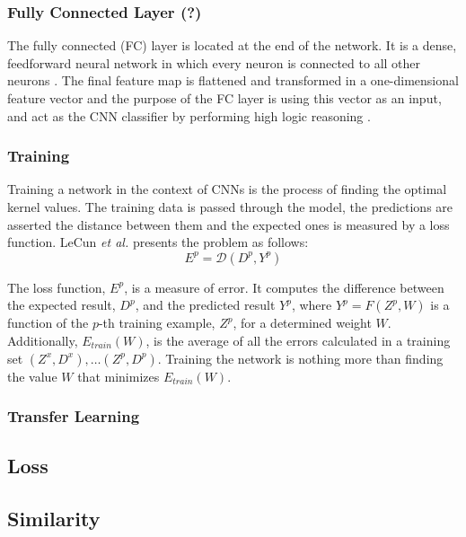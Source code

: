 \documentclass[class=report, crop=false, a4paper, 12pt]{standalone}
\begin{document}
\subsubsection{Fully Connected Layer (?)}
The fully connected (FC) layer is located at the end of the network. It is a dense, feedforward neural network in which every neuron is connected to all other neurons \autocite{yamashitaConvolutionalNeuralNetworks2018, alzubaidiReviewDeepLearning2021}. The final feature map is flattened and transformed in a one-dimensional feature vector and the purpose of the FC layer is using this vector as an input, and act as the CNN classifier by performing high logic reasoning \autocite{guRecentAdvancesConvolutional2018}.

\subsubsection{Training}
Training a network in the context of CNNs is the process of finding the optimal kernel values. The training data is passed through the model, the predictions are asserted the distance between them and the expected ones is measured by a loss function. LeCun \textit{et al.} \autocite{lecunGradientBasedLearningApplied1998} presents the problem as follows:
$$
E^p = \mathcal{D}(D^p, Y^p)
$$

\noindent The loss function, $E^p$, is a measure of error. It computes the difference between the expected result, $D^p$, and the predicted result $Y^p$, where $Y^p = F(Z^p, W)$ is a function of the $p$-th training example, $Z^p$, for a determined weight $W$. Additionally, $E_{train}(W)$, is the average of all the errors calculated in a training set ${(Z^x, D^x),\dots (Z^p, D^p)}$. Training the network is nothing more than finding the value $W$ that minimizes $E_{train}(W)$.



\label{transf learning}
\subsubsection{Transfer Learning}

\subsection{Loss}
\subsection{Similarity}
\end{document}
